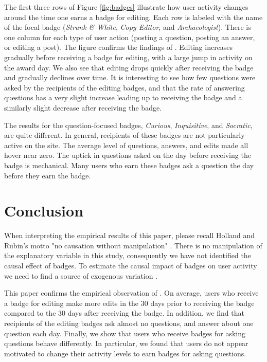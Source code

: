 \documentclass{article}
\newcommand{\1}{\mathds{1}}
\begin{document}
The first three rows of Figure \ref{fig:badges} illustrate how user activity changes around the time one earns a badge for editing. Each row is labeled with the name of the focal badge (\textit{Strunk \& White}, \textit{Copy Editor}, and \textit{Archaeologist}). There is one column for each type of user action (posting a question, posting an answer, or editing a post). The figure confirms the findings of \citet{Grant2013}. Editing increases gradually before receiving a badge for editing, with a large jump in activity on the award day. We also see that editing drops quickly after receiving the badge and gradually declines over time. It is interesting to see how few questions were asked by the recipients of the editing badges, and that the rate of answering questions has a very slight increase leading up to receiving the badge and a similarly slight decrease after receiving the badge.

The results for the question-focused badges, \textit{Curious}, \textit{Inquisitive}, and \textit{Socratic}, are quite different. In general, recipients of these badges are not particularly active on the site. The average level of questions, answers, and edits made all hover near zero. The uptick in questions asked on the day before receiving the badge is mechanical. Many users who earn these badges ask a question the day before they earn the badge.

\section{Conclusion}

When interpreting the empirical results of this paper, please recall Holland and Rubin's motto "no causation without manipulation" \citep{Holland1986}. There is no manipulation of the explanatory variable in this study, consequently we have not identified the causal effect of badges. To estimate the causal impact of badges on user activity we need to find a source of exogenous variation \citep{Miller2013}.

This paper confirms the empirical observation of \citet{Grant2013}. On average, users who receive a badge for editing make more edits in the 30 days prior to receiving the badge compared to the 30 days after receiving the badge. In addition, we find that recipients of the editing badges ask almost no questions, and answer about one question each day. Finally, we show that users who receive badges for asking questions behave differently. In particular, we found that users do not appear motivated to change their activity levels to earn badges for asking questions.
\end{document}
